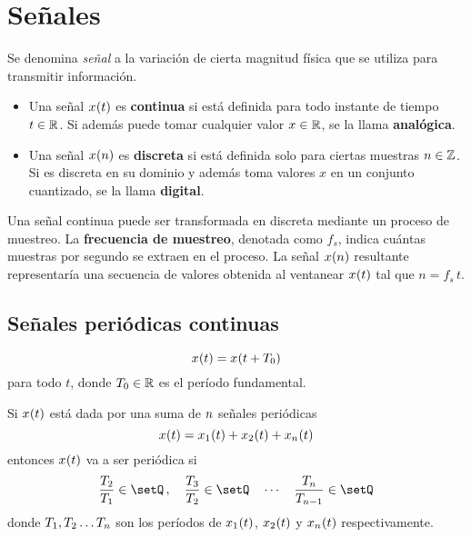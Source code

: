 \chapter{Señales}

Se denomina \emph{señal} a la variación de cierta magnitud física que se utiliza para transmitir información.

\begin{itemize}
    \item
    Una señal $\fx[x]{t}$ es \textbf{continua} si está definida para todo instante de tiempo $t \in \setR$.
    Si además puede tomar cualquier valor $x \in \setR$, se la llama \textbf{analógica}.

    \item
    Una señal $\fx[x]{n}$ es \textbf{discreta} si está definida solo para ciertas muestras $n \in \setZ$.
    Si es discreta en su dominio y además toma valores $x$ en un conjunto cuantizado, se la llama \textbf{digital}.
\end{itemize}

Una señal continua puede ser transformada en discreta mediante un proceso de muestreo.
La \textbf{frecuencia de muestreo}, denotada como $f_s$, indica cuántas muestras por segundo se extraen en el proceso.
La señal $\fx[x]{n}$ resultante representaría una secuencia de valores obtenida al ventanear $\fx[x]{t}$ tal que $n = f_s \, t$.

\section{Señales periódicas continuas}

\begin{mdframed}[style=DefinitionFrame]
    \begin{defn}
    \end{defn}
    \begin{equation*}
        \fx[x]{t} = \fx[x]{t + T_0}
    \end{equation*}
    para todo $t$, donde $T_0 \in \setR$ es el período fundamental.
\end{mdframed}

Si $\fx[x]{t}$ está dada por una suma de $\nth$ señales periódicas
\[
    \fx[x]{t} = \fx[x_1]{t} + \fx[x_2]{t} + \fx[x_\nth]{t}
\]
entonces $\fx[x]{t}$ va a ser periódica si
\[
    \frac{T_2}{T_1} \in \setQ \, , \quad \frac{T_3}{T_2} \in \setQ \quad \cdots \quad \frac{T_\nth}{T_{\nth - 1}} \in \setQ
\]
donde $T_1, T_2 \dots T_\nth$ son los períodos de $\fx[x_1]{t}$, $\fx[x_2]{t}$ y $\fx[x_\nth]{t}$ respectivamente.


